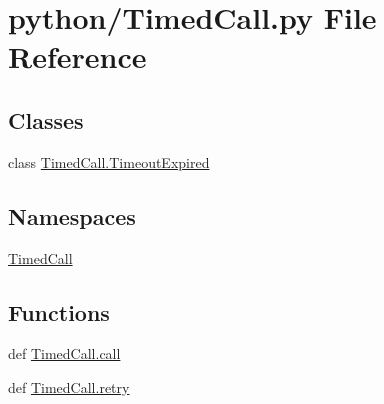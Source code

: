 \section{python/\-Timed\-Call.py File Reference}
\label{TimedCall_8py}
\subsection*{Classes}
\begin{DoxyCompactItemize}
\item 
class \hyperlink{classTimedCall_1_1TimeoutExpired}{Timed\-Call.\-Timeout\-Expired}
\end{DoxyCompactItemize}
\subsection*{Namespaces}
\begin{DoxyCompactItemize}
\item 
\hyperlink{namespaceTimedCall}{Timed\-Call}
\end{DoxyCompactItemize}
\subsection*{Functions}
\begin{DoxyCompactItemize}
\item 
def \hyperlink{namespaceTimedCall_a18f2f4c97948fe958f5bcd5a9f946f41}{Timed\-Call.\-call}
\item 
def \hyperlink{namespaceTimedCall_aee21234aedcca14d0dfc97ad4e9b1764}{Timed\-Call.\-retry}
\end{DoxyCompactItemize}
